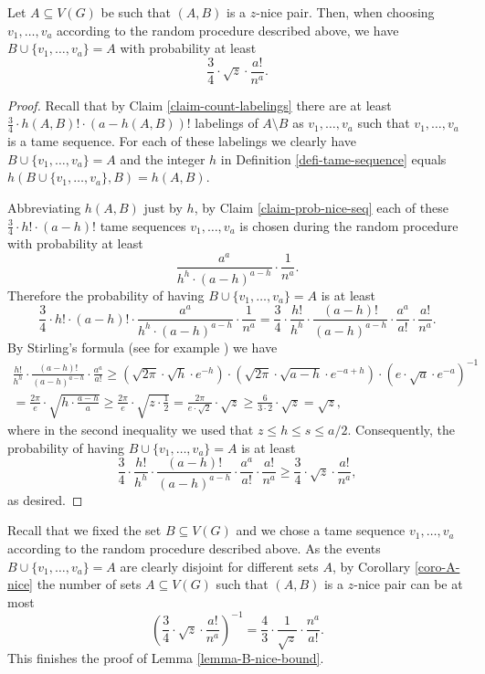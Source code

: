 \begin{corollary}\label{coro-A-nice} Let $A\subseteq V(G)$ be such that $(A,B)$ is a $z$-nice pair. Then, when choosing $v_1,\dots,v_a$ according to the random procedure described above, we have $B\cup \lbrace v_1,\dots,v_a\rbrace=A$ with probability at least
\[\frac{3}{4}\cdot \sqrt{z}\cdot \frac{a!}{n^a}.\]
\end{corollary}
\begin{proof}
Recall that by Claim \ref{claim-count-labelings} there are at least $\frac{3}{4}\cdot h(A,B)!\cdot (a-h(A,B))!$ labelings of $A\setminus B$ as $v_1,\dots,v_a$ such that $v_1,\dots,v_a$ is a tame sequence.  For each of these labelings we clearly have $B\cup \lbrace v_1,\dots,v_a\rbrace=A$ and the integer $h$ in Definition \ref{defi-tame-sequence} equals $h(B\cup \lbrace v_1,\dots,v_a\rbrace,B)=h(A,B)$.

Abbreviating $h(A,B)$ just by $h$, by Claim \ref{claim-prob-nice-seq} each of these $\frac{3}{4}\cdot h!\cdot (a-h)!$ tame sequences $v_1,\dots,v_a$ is chosen during the random procedure with probability at least
\[\frac{a^a}{h^h\cdot (a-h)^{a-h}}\cdot \frac{1}{n^a}.\]
Therefore the probability of having $B\cup \lbrace v_1,\dots,v_a\rbrace=A$ is at least
\[\frac{3}{4}\cdot h!\cdot (a-h)!\cdot \frac{a^a}{h^h\cdot (a-h)^{a-h}}\cdot \frac{1}{n^a}=\frac{3}{4}\cdot \frac{h!}{h^h}\cdot \frac{(a-h)!}{(a-h)^{a-h}}\cdot \frac{a^a}{a!}\cdot \frac{a!}{n^a}.\]
By Stirling's formula (see for example \cite{robbins}) we have
\begin{multline*}
\frac{h!}{h^h}\cdot \frac{(a-h)!}{(a-h)^{a-h}}\cdot \frac{a^a}{a!}\geq 
\left(\sqrt{2\pi}\cdot \sqrt{h}\cdot e^{-h}\right)\cdot \left(\sqrt{2\pi}\cdot \sqrt{a-h}\cdot e^{-a+h}\right)\cdot \left(e\cdot \sqrt{a}\cdot e^{-a}\right)^{-1}\\
=\frac{2\pi}{e}\cdot \sqrt{h\cdot\frac{a-h}{a}}\geq \frac{2\pi}{e}\cdot \sqrt{z\cdot\frac{1}{2}}=\frac{2\pi}{e\cdot \sqrt{2}}\cdot \sqrt{z}\geq \frac{6}{3\cdot 2}\cdot \sqrt{z}=\sqrt{z},
\end{multline*}
where in the second inequality we used that $z\leq h\leq s\leq a/2$. Consequently, the probability of having $B\cup \lbrace v_1,\dots,v_a\rbrace=A$ is at least
\[\frac{3}{4}\cdot\frac{h!}{h^h}\cdot \frac{(a-h)!}{(a-h)^{a-h}}\cdot \frac{a^a}{a!}\cdot \frac{a!}{n^a}\geq\frac{3}{4}\cdot \sqrt{z}\cdot \frac{a!}{n^a},\]
as desired.
\end{proof}
Recall that we fixed the set $B\subseteq V(G)$ and we chose a tame sequence $v_1,\dots,v_a$ according to the random procedure described above. As the events $B\cup \lbrace v_1,\dots,v_a\rbrace=A$ are clearly disjoint for different sets $A$, by Corollary \ref{coro-A-nice} the number of sets $A\subseteq V(G)$ such that $(A,B)$ is a $z$-nice pair can be at most
\[\left(\frac{3}{4}\cdot \sqrt{z}\cdot \frac{a!}{n^a}\right)^{-1}=\frac{4}{3}\cdot \frac{1}{\sqrt{z}}\cdot \frac{n^a}{a!}.\]
This finishes the proof of Lemma \ref{lemma-B-nice-bound}.

